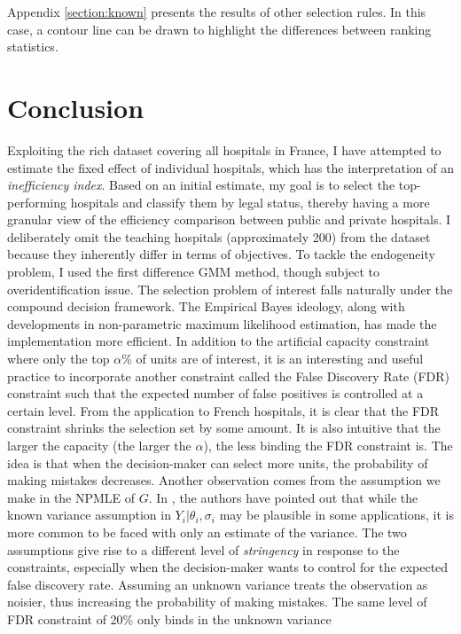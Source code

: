 \documentclass[12pt]{article}
\begin{document}
Appendix \ref{section:known} presents the results of other selection rules. In
this case, a contour line can be drawn to highlight the differences between
ranking statistics.

\section{Conclusion}
Exploiting the rich dataset covering all hospitals in France, I have attempted
to estimate the fixed effect of individual hospitals, which has the
interpretation of an \textit{inefficiency index}. Based on an initial estimate,
my goal is to select the top-performing hospitals and classify them by legal
status, thereby having a more granular view of the efficiency comparison
between public and private hospitals. I deliberately omit the teaching
hospitals (approximately 200) from the dataset because they inherently differ
in terms of objectives. To tackle the endogeneity problem, I used the first
difference GMM method, though subject to overidentification issue. The
selection problem of interest falls naturally under the compound decision
framework. The Empirical Bayes ideology, along with developments in
non-parametric maximum likelihood estimation, has made the implementation more
efficient. In addition to the artificial capacity constraint where only the top
$\alpha\%$ of units are of interest, it is an interesting and useful practice
to incorporate another constraint called the False Discovery Rate (FDR)
constraint such that the expected number of false positives is controlled at a
certain level. From the application to French hospitals, it is clear that the
FDR constraint shrinks the selection set by some amount. It is also intuitive
that the larger the capacity (the larger the $\alpha$), the less binding the
FDR constraint is. The idea is that when the decision-maker can select more
units, the probability of making mistakes decreases. Another observation comes
from the assumption we make in the NPMLE of $G$. In \citet{gu2023invidious},
the authors have pointed out that while the known variance assumption in
$Y_i|\theta_i,\sigma_i$ may be plausible in some applications, it is more
common to be faced with only an estimate of the variance. The two assumptions
give rise to a different level of \textit{stringency} in response to the
constraints, especially when the decision-maker wants to control for the
expected false discovery rate. Assuming an unknown variance treats the
observation as noisier, thus increasing the probability of making mistakes. The
same level of FDR constraint of 20\% only binds in the unknown variance
\end{document}
